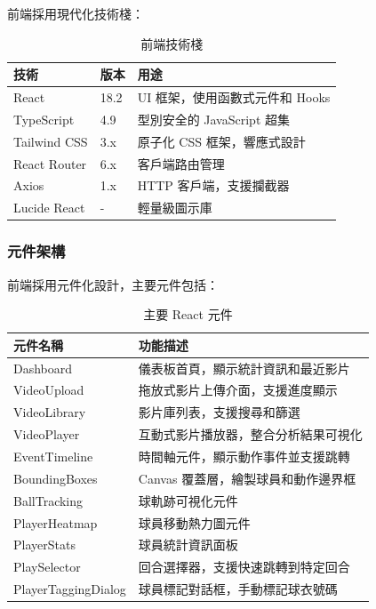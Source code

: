 \documentclass[a4paper,14pt,oneside]{article}
\begin{document}
前端採用現代化技術棧：

\begin{table}[H]
    \centering
    \caption{前端技術棧}
    \begin{tabular}{|l|l|p{6cm}|}
        \hline
        \textbf{技術} & \textbf{版本} & \textbf{用途} \\
        \hline
        React & 18.2 & UI 框架，使用函數式元件和 Hooks \\
        \hline
        TypeScript & 4.9 & 型別安全的 JavaScript 超集 \\
        \hline
        Tailwind CSS & 3.x & 原子化 CSS 框架，響應式設計 \\
        \hline
        React Router & 6.x & 客戶端路由管理 \\
        \hline
        Axios & 1.x & HTTP 客戶端，支援攔截器 \\
        \hline
        Lucide React & - & 輕量級圖示庫 \\
        \hline
    \end{tabular}
\end{table}

\subsubsection{元件架構}

前端採用元件化設計，主要元件包括：

\begin{table}[H]
    \centering
    \caption{主要 React 元件}
    \begin{tabular}{|l|p{8cm}|}
        \hline
        \textbf{元件名稱} & \textbf{功能描述} \\
        \hline
        Dashboard & 儀表板首頁，顯示統計資訊和最近影片 \\
        \hline
        VideoUpload & 拖放式影片上傳介面，支援進度顯示 \\
        \hline
        VideoLibrary & 影片庫列表，支援搜尋和篩選 \\
        \hline
        VideoPlayer & 互動式影片播放器，整合分析結果可視化 \\
        \hline
        EventTimeline & 時間軸元件，顯示動作事件並支援跳轉 \\
        \hline
        BoundingBoxes & Canvas 覆蓋層，繪製球員和動作邊界框 \\
        \hline
        BallTracking & 球軌跡可視化元件 \\
        \hline
        PlayerHeatmap & 球員移動熱力圖元件 \\
        \hline
        PlayerStats & 球員統計資訊面板 \\
        \hline
        PlaySelector & 回合選擇器，支援快速跳轉到特定回合 \\
        \hline
        PlayerTaggingDialog & 球員標記對話框，手動標記球衣號碼 \\
        \hline
    \end{tabular}
\end{table}
\end{document}
